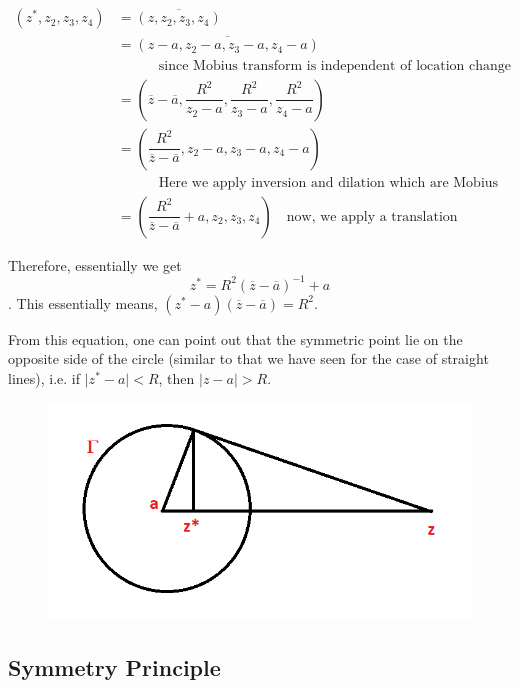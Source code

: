 \documentclass[12pt]{article}
\theoremstyle{definition}
\newenvironment{note}{
\begin{tcolorbox}[colback=blue!5!white,colframe=blue!75!black,title=Note, parbox = false] }{\end{tcolorbox} }
\begin{document}
\begin{align*}
    (z^\ast, z_2, z_3, z_4) 
    & = \overline{(z, z_2, z_3, z_4)}\\
    & = \overline{(z - a, z_2 - a, z_3 - a, z_4 - a)} \\
    & \qquad \quad \text{since Mobius transform is independent of location change}\\
    & = \left( \overline{z} - \overline{a}, \dfrac{R^2}{z_2 - a}, \dfrac{R^2}{z_3 - a}, \dfrac{R^2}{z_4 - a} \right)\\
    & = \left( \dfrac{R^2}{\overline{z} - \overline{a}}, z_2 - a, z_3 - a, z_4 - a \right) \\
    & \qquad \quad \text{Here we apply inversion and dilation which are Mobius transform}\\
    & = \left( \dfrac{R^2}{\overline{z} - \overline{a}} + a, z_2, z_3, z_4 \right) \quad \text{now, we apply a translation}
\end{align*}


Therefore, essentially we get $$z^\ast = R^2 (\overline{z} - \overline{a})^{-1} + a$$. This essentially means, $(z^\ast - a)(\overline{z} - \overline{a}) = R^2$. 

\begin{note}
    From this equation, one can point out that the symmetric point lie on the opposite side of the circle (similar to that we have seen for the case of straight lines), i.e. if $\vert z^\ast - a\vert < R$, then $\vert z - a \vert > R$.
\end{note}

\begin{figure}[ht]
    \centering
    \includegraphics[width = 0.75\linewidth]{complex-figures/symmetricity.png}
\end{figure}


\subsection{Symmetry Principle}
\end{document}
